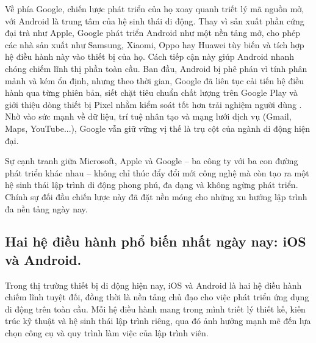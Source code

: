       \vspace{0.5em}
    
      \hspace*{0.8cm}Về phía Google, chiến lược phát triển của họ xoay quanh triết lý mã nguồn mở, với Android là trung tâm của hệ sinh thái di động. Thay vì sản xuất phần cứng đại trà như Apple, Google phát triển Android như một nền tảng mở, cho phép các nhà sản xuất như Samsung, Xiaomi, Oppo hay Huawei tùy biến và tích hợp hệ điều hành này vào thiết bị của họ. Cách tiếp cận này giúp Android nhanh chóng chiếm lĩnh thị phần toàn cầu. Ban đầu, Android bị phê phán vì tính phân mảnh và kém ổn định, nhưng theo thời gian, Google đã liên tục cải tiến hệ điều hành qua từng phiên bản, siết chặt tiêu chuẩn chất lượng trên Google Play và giới thiệu dòng thiết bị Pixel nhằm kiểm soát tốt hơn trải nghiệm người dùng \cite{android-evolution}. Nhờ vào sức mạnh về dữ liệu, trí tuệ nhân tạo và mạng lưới dịch vụ (Gmail, Maps, YouTube...), Google vẫn giữ vững vị thế là trụ cột của ngành di động hiện đại.
    
      \vspace{0.5em}
    
      \hspace*{0.8cm}Sự cạnh tranh giữa Microsoft, Apple và Google – ba công ty với ba con đường phát triển khác nhau – không chỉ thúc đẩy đổi mới công nghệ mà còn tạo ra một hệ sinh thái lập trình di động phong phú, đa dạng và không ngừng phát triển. Chính sự đối đầu chiến lược này đã đặt nền móng cho những xu hướng lập trình đa nền tảng ngày nay.
    

\subsection{Hai hệ điều hành phổ biến nhất ngày nay: iOS và Android.}
\renewcommand{\labelitemi}{--}   

  \hspace*{0.8cm}Trong thị trường thiết bị di động hiện nay, iOS và Android là hai hệ điều hành chiếm lĩnh tuyệt đối, đồng thời là nền tảng chủ đạo cho việc phát triển ứng dụng di động trên toàn cầu. Mỗi hệ điều hành mang trong mình triết lý thiết kế, kiến trúc kỹ thuật và hệ sinh thái lập trình riêng, qua đó ảnh hưởng mạnh mẽ đến lựa chọn công cụ và quy trình làm việc của lập trình viên.


